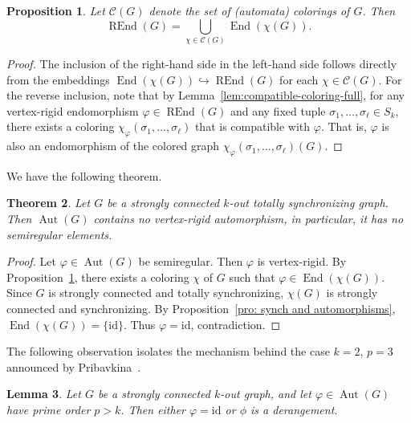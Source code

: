 \documentclass[a4paper,10pt]{amsart}
\theoremstyle{plain}
\newtheorem{theorem}{Theorem}[section]
\newtheorem{lemma}[theorem]{Lemma}
\newtheorem{proposition}[theorem]{Proposition}
\theoremstyle{definition}
\DeclareMathOperator{\Aut}{Aut}
\DeclareMathOperator{\End}{End}
\DeclareMathOperator{\REnd}{REnd}
\newcommand{\id}{\mathrm{id}}
\begin{document}
\begin{proposition}\label{prop: rigid in end of automaton}
Let $\mathcal{C}(G)$ denote the set of (automata) colorings of $G$. Then
\[
\REnd(G) = \bigcup_{\chi \in \mathcal{C}(G)} \End(\chi(G)).
\]
\end{proposition}

\begin{proof}
The inclusion of the right-hand side in the left-hand side follows directly from the embeddings
\(\End(\chi(G)) \hookrightarrow \REnd(G)\) for each \(\chi \in \mathcal{C}(G)\).  For the reverse inclusion, note that by Lemma~\ref{lem:compatible-coloring-full}, for any vertex-rigid endomorphism
\(\varphi \in \REnd(G)\) and any fixed tuple \(\sigma_1, \dots, \sigma_\ell \in S_k\), there exists a coloring
\(\chi_{\varphi}(\sigma_1, \dots, \sigma_\ell)\) that is compatible with \(\varphi\). 
That is, \(\varphi\) is also an endomorphism of the colored graph
\(\chi_{\varphi}(\sigma_1, \dots, \sigma_\ell)(G)\).
\end{proof}
We have the following theorem.
\begin{theorem}\label{theo: main}
Let $G$ be a strongly connected $k$-out totally synchronizing graph.
Then $\Aut(G)$ contains no vertex-rigid automorphism, in particular, it has no semiregular elements.
\end{theorem}

\begin{proof}
Let $\varphi\in\Aut(G)$ be semiregular. Then $\varphi$ is vertex-rigid.
By Proposition~\ref{prop: rigid in end of automaton}, there exists a coloring $\chi$ of $G$ such that
$\varphi\in\End(\chi(G))$.
Since $G$ is strongly connected and totally synchronizing, $\chi(G)$ is strongly connected and synchronizing.
By Proposition~\ref{pro: synch and automorphisms}, $\End(\chi(G))=\{\id\}$.
Thus $\varphi=\id$, contradiction.
\end{proof}
The following observation isolates the mechanism behind the case $k=2$, $p=3$ announced by Pribavkina~\cite{PribavkinaSandGAL2019}.

\begin{lemma}\label{lem:prime-order-derangement}
Let $G$ be a strongly connected $k$-out graph, and let $\varphi\in\Aut(G)$ have prime order $p>k$. Then either $\varphi=\id$ or $\phi$ is a derangement.
\end{lemma}
\end{document}
